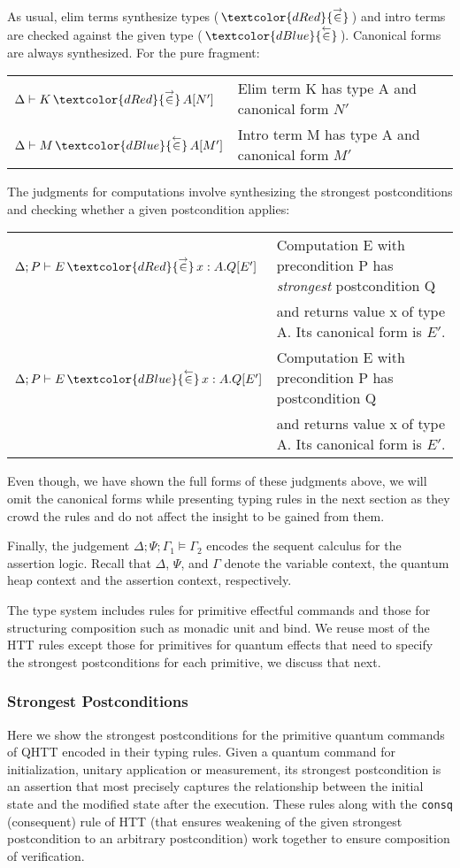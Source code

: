 \documentclass[acmsmall,nonacm,timestamp,review=false,anonymous=false]{acmart}
\newcommand{\chkcolor}{dBlue}
\newcommand{\syncolor}{dRed}
\newcommand{\chk}{\,\textcolor{\chkcolor}{{\stackrel{\leftarrow}{\in}}}\,}
\newcommand{\uncoloredsyn}{{{\stackrel{\rightarrow}{\in}}}}
\newcommand{\syn}{\,\textcolor{\syncolor}{\uncoloredsyn}\,}
\newcommand{\prove}{\models}
\begin{document}
As usual, elim terms synthesize types ($\syn$) and intro terms are checked against the given type ($\chk$). Canonical forms are always synthesized. For the pure fragment:

\begin{center}
	\begin{tabular}{ll}
		$\Delta \vdash K \syn A [N']$ & Elim term K has type A and canonical form $N'$ \\
		$\Delta \vdash M \chk A [M']$ & Intro term M has type A and canonical form $M'$
	\end{tabular}
\end{center}

The judgments for computations involve synthesizing the strongest postconditions and checking whether a given postcondition applies:

\begin{center}
	\begin{tabular}{ll}
		$\Delta; P \vdash E \syn x:A.Q[E']$ & Computation E with precondition P has \textit{strongest} postcondition Q\\ & and returns value x of type A. Its canonical form is $E'$. \\
		$\Delta; P \vdash E \chk x:A.Q[E']$ & Computation E with precondition P has postcondition Q\\ & and returns value x of type A. Its canonical form is $E'$.
	\end{tabular}
\end{center}

Even though, we have shown the full forms of these judgments above, we will omit the canonical forms while presenting typing rules in the next section as they crowd the rules and do not affect the insight to be gained from them.

Finally, the judgement $\Delta; \Psi; \Gamma_1 \prove \Gamma_2$ encodes the sequent calculus for the assertion logic. Recall that $\Delta$, $\Psi$, and $\Gamma$ denote the variable context, the quantum heap context and the assertion context, respectively.

The type system includes rules for primitive effectful commands and those for structuring composition such as monadic unit and bind. We reuse most of the HTT rules except those for primitives for quantum effects that need to specify the strongest postconditions for each primitive, we discuss that next.

\subsubsection{Strongest Postconditions}
Here we show the strongest postconditions for the primitive quantum commands of QHTT encoded in their typing rules. Given a quantum command for initialization, unitary application or measurement, its strongest postcondition is an assertion that most precisely captures the relationship between the initial state and the modified state after the execution. These rules along with the \texttt{consq} (consequent) rule of HTT (that ensures weakening of the given strongest postcondition to an arbitrary postcondition) work together to ensure composition of verification.
\end{document}
